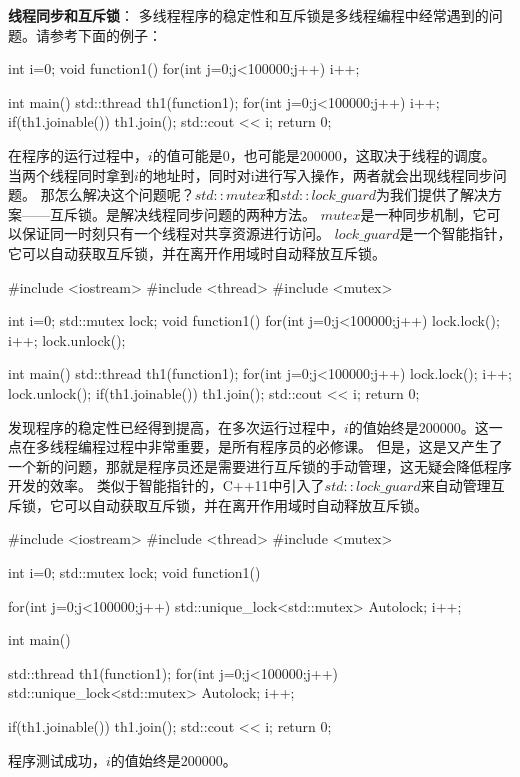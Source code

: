 \textbf{线程同步和互斥锁}：
多线程程序的稳定性和互斥锁是多线程编程中经常遇到的问题。请参考下面的例子：
\begin{tcode}
int i=0;
void function1(){
    for(int j=0;j<100000;j++)
        i++;
}

int main() {
    std::thread th1(function1);
    for(int j=0;j<100000;j++)
        i++;
    if(th1.joinable())
        th1.join();
    std::cout << i;
    return 0;
}
\end{tcode}
在程序的运行过程中，$i$的值可能是$0$，也可能是$200000$，这取决于线程的调度。
当两个线程同时拿到$i$的地址时，同时对i进行写入操作，两者就会出现线程同步问题。
那怎么解决这个问题呢？$std::mutex$和$std::lock\_guard$为我们提供了解决方案——互斥锁。是解决线程同步问题的两种方法。
$mutex$是一种同步机制，它可以保证同一时刻只有一个线程对共享资源进行访问。
$lock\_guard$是一个智能指针，它可以自动获取互斥锁，并在离开作用域时自动释放互斥锁。

\begin{tcode}
#include <iostream>
#include <thread>
#include <mutex>

int i=0;
std::mutex lock;
void function1(){
    for(int j=0;j<100000;j++){
        lock.lock();
        i++;
        lock.unlock();
    }
}

int main() {
    std::thread th1(function1);
    for(int j=0;j<100000;j++){
        lock.lock();
        i++;
        lock.unlock();
    }
    if(th1.joinable())
        th1.join();
    std::cout << i;
    return 0;
}
\end{tcode}
发现程序的稳定性已经得到提高，在多次运行过程中，$i$的值始终是$200000$。这一点在多线程编程过程中非常重要，是所有程序员的必修课。
但是，这是又产生了一个新的问题，那就是程序员还是需要进行互斥锁的手动管理，这无疑会降低程序开发的效率。
类似于智能指针的，C++11中引入了$std::lock\_guard$来自动管理互斥锁，它可以自动获取互斥锁，并在离开作用域时自动释放互斥锁。

\begin{tcode}
#include <iostream>
#include <thread>
#include <mutex>

int i=0;
std::mutex lock;
void function1(){
    for(int j=0;j<100000;j++){
        std::unique_lock<std::mutex> Autolock;
        i++;
    }

}

int main() {
    std::thread th1(function1);
    for(int j=0;j<100000;j++){
        std::unique_lock<std::mutex> Autolock;
        i++;
    }

    if(th1.joinable())
        th1.join();
    std::cout << i;
    return 0;
}
\end{tcode}
程序测试成功，$i$的值始终是$200000$。

